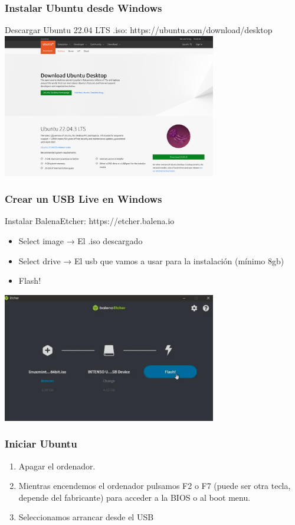 \documentclass[10pt]{beamer}
\begin{document}
	\begin{frame}
		\frametitle{Instalar Ubuntu desde Windows}
		Descargar Ubuntu 22.04 LTS .iso: https://ubuntu.com/download/desktop\\
		\includegraphics[width=0.7\textwidth]{ubuntu}
	\end{frame}
	
	\begin{frame}
		\frametitle{Crear un USB Live en Windows}
		Instalar BalenaEtcher: https://etcher.balena.io\\
		\begin{itemize}
			\item Select image → El .iso descargado
			\item Select drive → El usb que vamos a usar para la instalación (mínimo 8gb)
			\item Flash!
		\end{itemize}
		\includegraphics[width=0.7\textwidth]{balena}
	\end{frame}
	
	\begin{frame}
		\frametitle{Iniciar Ubuntu}
		\begin{enumerate}
			\item Apagar el ordenador.
			\item Mientras encendemos el ordenador pulsamos F2 o F7 (puede ser otra tecla, depende del fabricante) para acceder a la BIOS o al boot menu.
			\item Seleccionamos arrancar desde el USB
		\end{enumerate}
	\end{frame}
	
\end{document}
